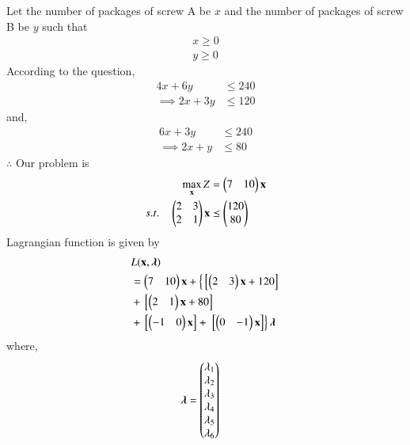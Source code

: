 
\begin{table}[!ht]
\centering
{}
\caption{Screw Requirements}
\label{opt/16/tab:table1}
\end{table}
Let the number of packages of screw  A be $x$ and the number of packages of screw B be $y$  such that 
\begin{align}
    x \geq 0 \\
    y \geq 0 
\end{align}
According to the question,
\begin{align}
    4x+6y &\leq 240 \\
 \implies 2x+3y &\leq 120
\end{align}
     and,
\begin{align}
    6x+3y &\leq 240 \\
 \implies 2x+y &\leq 80
\end{align}
$\therefore$ Our problem is
\begin{align}
        \max_{\mathbf{x}} Z &= \begin{pmatrix}7 & 10\end{pmatrix}\mathbf{x}\\
        s.t. \quad 
        \begin{pmatrix}2 & 3 \\ 2 & 1 \end{pmatrix}\mathbf{x} &\preceq \begin{pmatrix}120\\80\end{pmatrix} 
\end{align}
Lagrangian function is given by
\begin{equation}
\begin{aligned}
    &L(\mathbf{x},\boldsymbol{\lambda}) \\ &= \begin{pmatrix}7 & 10\end{pmatrix}\mathbf{x}+\left\{{}\left[\begin{pmatrix}2 & 3\end{pmatrix}\mathbf{x}+120\right]\right. \\ &+ {}\left[\begin{pmatrix}2 & 1\end{pmatrix}\mathbf{x}+80\right] \\ &+ {}\left[\begin{pmatrix}-1 & 0\end{pmatrix}\mathbf{x}\right] +\left.{}\left[\begin{pmatrix}0 & -1\end{pmatrix}\mathbf{x}\right]\right\}\boldsymbol{\lambda}
\end{aligned}
\end{equation}
where,
\begin{align}
    \boldsymbol{\lambda} &= \begin{pmatrix}\lambda_1 \\ \lambda_2 \\ \lambda_3 \\ \lambda_4 \\ \lambda_5 \\ \lambda_6\end{pmatrix}
\end{align}
